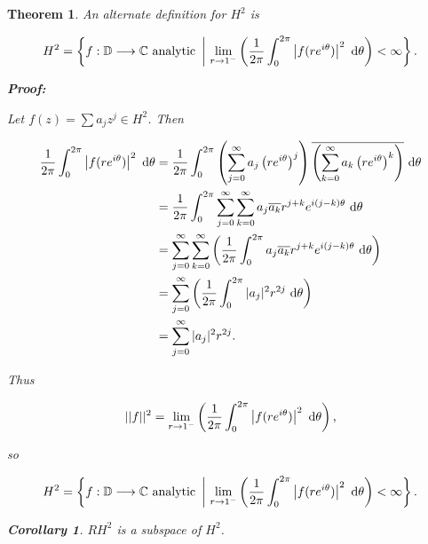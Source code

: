 \documentclass{article}
\theoremstyle{colontheorem}
\newtheorem{theorem}{Theorem}[section]
\newtheorem{corollary}{Corollary}[theorem]
\newenvironment{Theorem}
{
	\begin{mdframed}[backgroundcolor=TheoremOrange!10]
	\begin{theorem}
}
{
	\end{theorem}
	\end{mdframed}
	
	\vspace{.15in}
}
\newenvironment{Corollary}
{
	\begin{mdframed}[backgroundcolor=CorollaryBlue!10]
	\begin{corollary}
}
{
	\end{corollary}
	\end{mdframed}
	
	\vspace{.09in}
}
\newenvironment{Proof}
{
	\begin{mdframed}[backgroundcolor=ProofPurple!10]
	\textbf{Proof:}%
}
{
	\end{mdframed}
	
	\vspace{.085in}
}
\begin{document}
\begin{Theorem}
	
	An alternate definition for $H^2$ is
	
	$$
		H^2 = \left\{ f : \mathbb{D} \longrightarrow \mathbb{C} \textnormal{ analytic}\ \left|\ \lim\limits_{r \to 1^-} \left( \frac{1}{2 \pi} \int_0^{2 \pi} \left| f(r e^{i \theta}) \right|^2\ \textnormal{d}\theta \right) < \infty \right\} . \right.
	$$
	
	\begin{Proof}
		Let $f(z) = \displaystyle\sum a_j z^j \in H^2$. Then
		
		\begin{align*}
			\frac{1}{2 \pi} \int_0^{2 \pi} \left| f(r e^{i \theta}) \right|^2\ \textnormal{d}\theta &= \frac{1}{2 \pi} \int_0^{2 \pi} \left( \displaystyle\sum\limits_{j = 0}^\infty a_j \left( re^{i \theta} \right)^j \right) \overline{\left( \displaystyle\sum\limits_{k = 0}^\infty a_k \left( re^{i \theta} \right)^k \right)}\ \textnormal{d}\theta\\
			&= \frac{1}{2 \pi} \int_0^{2 \pi} \displaystyle\sum\limits_{j = 0}^\infty \displaystyle\sum\limits_{k = 0}^\infty a_j \overline{a_k} r^{j + k} e^{i (j - k) \theta}\ \textnormal{d}\theta\\
			&= \sum\limits_{j = 0}^\infty \displaystyle\sum\limits_{k = 0}^\infty \left( \frac{1}{2 \pi} \int_0^{2 \pi} a_j \overline{a_k} r^{j + k} e^{i (j - k) \theta}\ \textnormal{d}\theta \right)\\
			&= \sum\limits_{j = 0}^\infty \left( \frac{1}{2 \pi} \int_0^{2 \pi} |a_j|^2 r^{2j}\ \textnormal{d}\theta \right)\\
			&= \sum\limits_{j = 0}^\infty |a_j|^2 r^{2j}.
		\end{align*}
		
		Thus
		
		$$
			||f||^2 = \lim\limits_{r \to 1^-} \left( \frac{1}{2 \pi} \int_0^{2 \pi} \left| f(r e^{i \theta}) \right|^2\ \textnormal{d}\theta \right) \textnormal{,}
		$$
		
		so
		
		$$
			H^2 = \left\{ f : \mathbb{D} \longrightarrow \mathbb{C} \textnormal{ analytic}\ \left|\ \lim\limits_{r \to 1^-} \left( \frac{1}{2 \pi} \int_0^{2 \pi} \left| f(r e^{i \theta}) \right|^2\ \textnormal{d}\theta \right) < \infty \right\}. \right.
		$$
		
	\end{Proof}
	
	
	
	\begin{Corollary}
		
		$RH^2$ is a subspace of $H^2$.
		
	\end{Corollary}
	
\end{Theorem}
\end{document}
